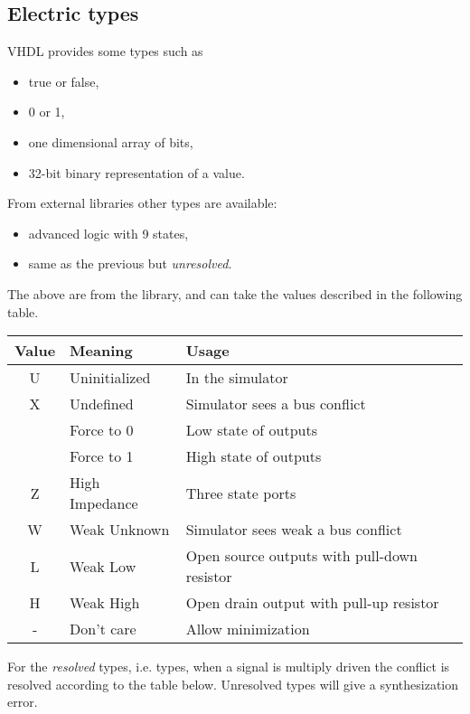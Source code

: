 \subsection{Electric types}
VHDL provides some types such as
\begin{itemize}
  \item {} true or false,
  \item {} 0 or 1,
  \item {} one dimensional array of bits,
  \item {} 32-bit binary representation of a value.
\end{itemize}
From external libraries other types are available:
\begin{itemize}
  \item {} advanced logic with 9 states,
  \item {} same as the previous but \emph{unresolved}.
\end{itemize}
The above are from the  library, and can take the
values described in the following table.
\begin{center}
  \begin{tabularx}{\linewidth}{>{\ttfamily}c l X}
    \toprule
    Value & Meaning & Usage \\
    \midrule
    U & Uninitialized  & In the simulator \\
    X & Undefined      & Simulator sees a bus conflict \\
    0 & Force to 0     & Low state of outputs \\
    1 & Force to 1     & High state of outputs \\
    Z & High Impedance & Three state ports \\
    W & Weak Unknown   & Simulator sees weak a bus conflict \\
    L & Weak Low       & Open source outputs with pull-down resistor \\
    H & Weak High      & Open drain output with pull-up resistor \\
    - & Don't care     & Allow minimization \\
    \bottomrule
  \end{tabularx}
\end{center}
For the \emph{resolved} types, i.e.  types, when a signal is
multiply driven the conflict is resolved according to the table below.
Unresolved types will give a synthesization error.

